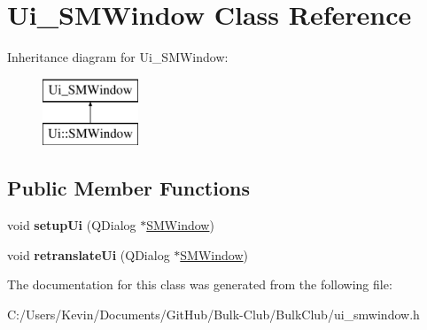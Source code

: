 \hypertarget{class_ui___s_m_window}{}\section{Ui\+\_\+\+S\+M\+Window Class Reference}
\label{class_ui___s_m_window}
Inheritance diagram for Ui\+\_\+\+S\+M\+Window\+:\begin{figure}[H]
\begin{center}
\leavevmode
\includegraphics[height=2.000000cm]{class_ui___s_m_window}
\end{center}
\end{figure}
\subsection*{Public Member Functions}
\begin{DoxyCompactItemize}
\item 
\mbox{\label{class_ui___s_m_window_a20e094c77ae12608c8e878dffafb44d1}} 
void {\bfseries setup\+Ui} (Q\+Dialog $\ast$\mbox{\hyperlink{class_s_m_window}{S\+M\+Window}})
\item 
\mbox{\label{class_ui___s_m_window_a8a2e726fbfb05f26986bfecd809e4b7b}} 
void {\bfseries retranslate\+Ui} (Q\+Dialog $\ast$\mbox{\hyperlink{class_s_m_window}{S\+M\+Window}})
\end{DoxyCompactItemize}


The documentation for this class was generated from the following file\+:\begin{DoxyCompactItemize}
\item 
C\+:/\+Users/\+Kevin/\+Documents/\+Git\+Hub/\+Bulk-\/\+Club/\+Bulk\+Club/ui\+\_\+smwindow.\+h\end{DoxyCompactItemize}
